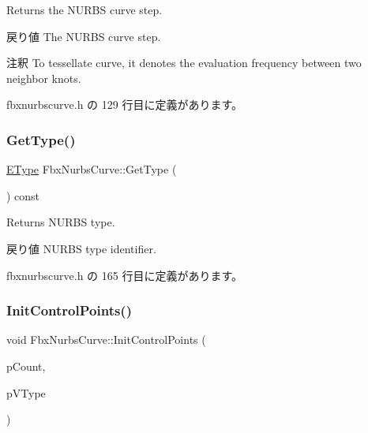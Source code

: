 Returns the N\+U\+R\+BS curve step. \begin{DoxyReturn}{戻り値}
The N\+U\+R\+BS curve step. 
\end{DoxyReturn}
\begin{DoxyRemark}{注釈}
To tessellate curve, it denotes the evaluation frequency between two neighbor knots. 
\end{DoxyRemark}


 fbxnurbscurve.\+h の 129 行目に定義があります。

\mbox{\label{class_fbx_nurbs_curve_a9dd3a14a0bc0aa298b58eb1b42ecd834}} 
\subsubsection{\texorpdfstring{Get\+Type()}{GetType()}}
{\footnotesize\ttfamily \hyperlink{class_fbx_nurbs_curve_a9f232f09798b106dcc2fd5e2d8c117ed}{E\+Type} Fbx\+Nurbs\+Curve\+::\+Get\+Type (\begin{DoxyParamCaption}{ }\end{DoxyParamCaption}) const\hspace{0.3cm}{\ttfamily [inline]}}

Returns N\+U\+R\+BS type. \begin{DoxyReturn}{戻り値}
N\+U\+R\+BS type identifier. 
\end{DoxyReturn}


 fbxnurbscurve.\+h の 165 行目に定義があります。

\mbox{\label{class_fbx_nurbs_curve_ac89cc4d5bf1bef1d88ee1b6e4b18be9b}} 
\subsubsection{\texorpdfstring{Init\+Control\+Points()}{InitControlPoints()}\hspace{0.1cm}{\footnotesize\ttfamily [1/2]}}
{\footnotesize\ttfamily void Fbx\+Nurbs\+Curve\+::\+Init\+Control\+Points (\begin{DoxyParamCaption}\item[{int}]{p\+Count,  }\item[{\hyperlink{class_fbx_nurbs_curve_a9f232f09798b106dcc2fd5e2d8c117ed}{E\+Type}}]{p\+V\+Type }\end{DoxyParamCaption})}

